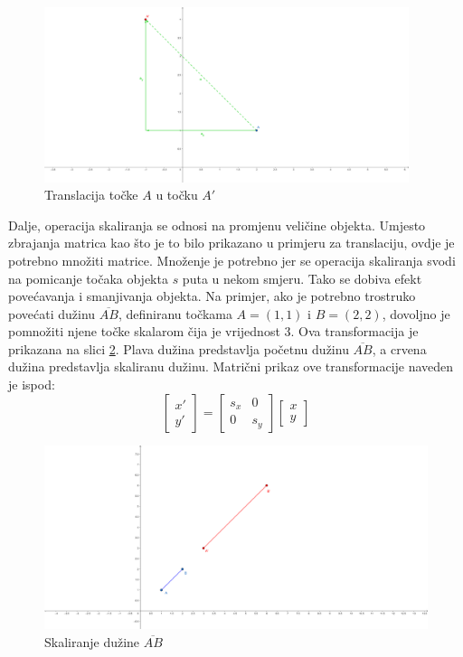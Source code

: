 \documentclass{foi}
\begin{document}
\begin{figure}[H]
    \centering
    \includegraphics[width=0.95\textwidth,trim={2cm 0cm 3cm 0cm},clip]{slike/30_Translacija.png}
    \captionsetup{justification=centering}
    \caption{Translacija točke $A$ u točku $A'$}
\label{fig:Translacija}
\end{figure}

Dalje, operacija skaliranja se odnosi na promjenu veličine objekta. Umjesto zbrajanja matrica kao što je to bilo prikazano u primjeru za translaciju, ovdje je potrebno množiti matrice. Množenje je potrebno jer se operacija skaliranja svodi na pomicanje točaka objekta $s$ puta u nekom smjeru. Tako se dobiva efekt povećavanja i smanjivanja objekta. Na primjer, ako je potrebno trostruko povećati dužinu $\overline{AB}$, definiranu točkama $A = (1, 1)$ i $B = (2, 2)$, dovoljno je pomnožiti njene točke skalarom čija je vrijednost 3. Ova transformacija je prikazana na slici \ref{fig:Skaliranje}. Plava dužina predstavlja početnu dužinu $\overline{AB}$, a crvena dužina predstavlja skaliranu dužinu. Matrični prikaz ove transformacije naveden je ispod:
\[
\begin{bmatrix}
x'\\
y' 
\end{bmatrix}
=
\begin{bmatrix}
s_x & 0\\
0 & s_y
\end{bmatrix}
\begin{bmatrix}
x\\
y
\end{bmatrix}
\]


\begin{figure}[H]
    \centering
    \includegraphics[width=1\textwidth,trim={3cm 0cm 3cm 0cm},clip]{slike/31_Skaliranje.png}
    \captionsetup{justification=centering}
    \caption{Skaliranje dužine $\overline{AB}$}
\label{fig:Skaliranje}
\end{figure}
\end{document}
